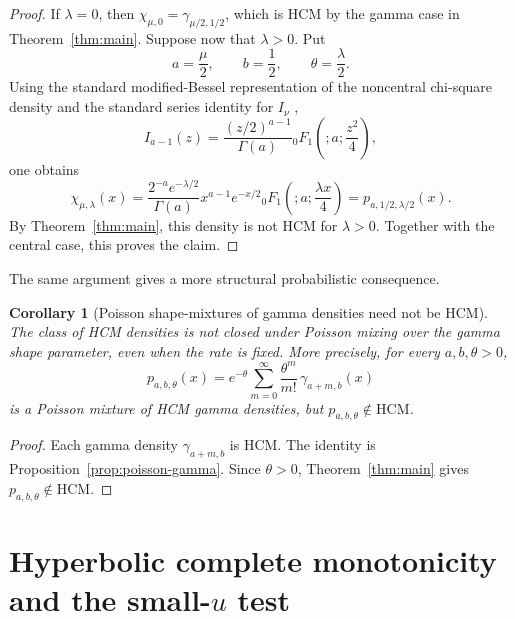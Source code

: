 ﻿\documentclass[preprint,12pt,authoryear]{elsarticle}
\newtheorem{corollary}{Corollary}
\newcommand{\HCM}{\mathrm{HCM}}
\begin{document}
\begin{proof}
If \(\lambda=0\), then \(\chi_{\mu,0}=\gamma_{\mu/2,1/2}\), which is HCM by the gamma case in Theorem~\ref{thm:main}.  Suppose now that \(\lambda>0\).  Put
\begin{equation}
a=\frac{\mu}{2},
\qquad
b=\frac12,
\qquad
\theta=\frac{\lambda}{2}.
\end{equation}
Using the standard modified-Bessel representation of the noncentral chi-square density \cite{JohnsonKotzBalakrishnan1994} and the standard series identity for \(I_\nu\) \cite[Eq.~10.25.2]{DLMF},
\begin{equation}
I_{a-1}(z)
=
\frac{(z/2)^{a-1}}{\Gamma(a)}
{}_0F_1\!\left(;a;\frac{z^2}{4}\right),
\end{equation}
one obtains
\begin{equation}
\chi_{\mu,\lambda}(x)
=
\frac{2^{-a}e^{-\lambda/2}}{\Gamma(a)}
x^{a-1}e^{-x/2}
{}_0F_1\!\left(;a;\frac{\lambda x}{4}\right)
=
p_{a,1/2,\lambda/2}(x).
\end{equation}
By Theorem~\ref{thm:main}, this density is not HCM for \(\lambda>0\).  Together with the central case, this proves the claim.
\end{proof}

The same argument gives a more structural probabilistic consequence.

\begin{corollary}[Poisson shape-mixtures of gamma densities need not be HCM]
\label{cor:poisson-mixture-not-hcm}
The class of HCM densities is not closed under Poisson mixing over the gamma shape parameter, even when the rate is fixed.  More precisely, for every \(a,b,\theta>0\),
\begin{equation}
p_{a,b,\theta}(x)
=
e^{-\theta}\sum_{m=0}^{\infty}
\frac{\theta^m}{m!}\,
\gamma_{a+m,b}(x)
\end{equation}
is a Poisson mixture of HCM gamma densities, but \(p_{a,b,\theta}\notin\HCM\).
\end{corollary}

\begin{proof}
Each gamma density \(\gamma_{a+m,b}\) is HCM.  The identity is Proposition~\ref{prop:poisson-gamma}.  Since \(\theta>0\), Theorem~\ref{thm:main} gives \(p_{a,b,\theta}\notin\HCM\).
\end{proof}

\section{Hyperbolic complete monotonicity and the small-\texorpdfstring{\(u\)}{u} test}
\end{document}
